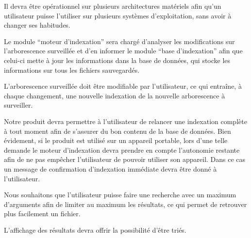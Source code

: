 Il devra être opérationnel sur plusieurs architectures matériels afin qu'un utilisateur puisse l'utiliser sur plusieurs systèmes d'exploitation, sans avoir à changer ses habitudes.

Le module \enquote{moteur d'indexation} sera chargé d'analyser les modifications sur l'arborescence surveillée et d'en informer le module \enquote{base d'indexation} afin que celui-ci mette à jour les informations dans la base de données, qui stocke les informations sur tous les fichiers sauvegardés.

L'arborescence surveillée doit être modifiable par l'utilisateur, ce qui entraîne, à chaque changement, une nouvelle indexation de la nouvelle arborescence à surveiller.

Notre produit devra permettre à l'utilisateur de relancer une indexation complète à tout
moment afin de s'assurer du bon contenu de la base de données. Bien évidement, si le
produit est utilisé sur un appareil portable, lors d'une telle demande le moteur d'indexation devra prendre en compte l'autonomie restante afin de ne pas empêcher l'utilisateur de pouvoir utiliser son appareil. Dans ce cas un message de confirmation d'indexation immédiate devra être donné à l'utilisateur.

Nous souhaitons que l'utilisateur puisse faire une recherche avec un maximum d'arguments
afin de limiter au maximum les résultats, ce qui permet de retrouver plus facilement un fichier.

L'affichage des résultats devra offrir la possibilité d'être triés.